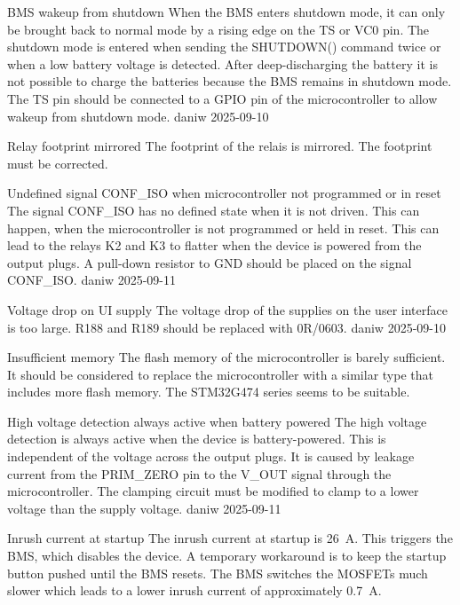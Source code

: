 \begin{ModTable}

\ModItemDone
{\acs{BMS} wakeup from shutdown}
{When the \ac{BMS} enters shutdown mode, it can only be brought back to normal mode by a rising edge on the TS or VC0 pin. The shutdown mode is entered when sending the SHUTDOWN() command twice or when a low battery voltage is detected. After deep-discharging the battery it is not possible to charge the batteries because the \ac{BMS} remains in shutdown mode. }
{The TS pin should be connected to a GPIO pin of the microcontroller to allow wakeup from shutdown mode. }
{daniw}
{2025-09-10}

\ModItemOpen
{Relay footprint mirrored}
{The footprint of the relais is mirrored. }
{The footprint must be corrected. }
{}
{}

\ModItemDone
{Undefined signal CONF\_ISO when microcontroller not programmed or in reset}
{The signal CONF\_ISO has no defined state when it is not driven. This can happen, when the microcontroller is not programmed or held in reset. This can lead to the relays K2 and K3 to flatter when the device is powered from the output plugs. }
{A pull-down resistor to GND should be placed on the signal CONF\_ISO. }
{daniw}
{2025-09-11}

\ModItemDone
{Voltage drop on UI supply}
{The voltage drop of the supplies on the user interface is too large. }
{R188 and R189 should be replaced with 0R/0603. }
{daniw}
{2025-09-10}

\ModItemOpen
{Insufficient memory}
{The flash memory of the microcontroller is barely sufficient. }
{It should be considered to replace the microcontroller with a similar type that includes more flash memory. The STM32G474 series seems to be suitable. }
{}
{}

\ModItemDone
{High voltage detection always active when battery powered}
{The high voltage detection is always active when the device is battery-powered. This is independent of the voltage across the output plugs. It is caused by leakage current from the PRIM\_ZERO pin to the V\_OUT signal through the microcontroller. }
{The clamping circuit must be modified to clamp to a lower voltage than the supply voltage. }
{daniw}
{2025-09-11}

\ModItemOpen
{Inrush current at startup}
{The inrush current at startup is \qty{26}{\ampere}. This triggers the \ac{BMS}, which disables the device. }
{A temporary workaround is to keep the startup button pushed until the \ac{BMS} resets. The \ac{BMS} switches the \acp{MOSFET} much slower which leads to a lower inrush current of approximately \qty{0.7}{\ampere}. }
{}
{}


\end{ModTable}
